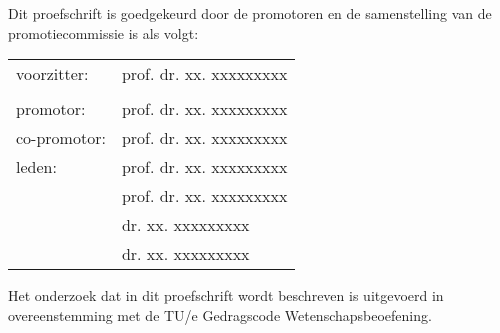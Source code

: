 \newpage
\thispagestyle{empty}

\noindent
Dit proefschrift is goedgekeurd door de promotoren en de samenstelling van de promotiecommissie is als volgt:\\[7mm]

\noindent
\begin{tabular}{@{}l p{9.8cm}}
voorzitter:                 &   prof. dr. xx. xxxxxxxxx \\                \\
promotor:                   &   prof. dr. xx. xxxxxxxxx \\
co-promotor:                &   prof. dr. xx. xxxxxxxxx \\
leden:                      &   prof. dr. xx. xxxxxxxxx \\
                            &   prof. dr. xx. xxxxxxxxx \\
                            &   dr. xx. xxxxxxxxx \\
                            &   dr. xx. xxxxxxxxx \\
\end{tabular}

\vfill
\noindent
Het onderzoek dat in dit proefschrift wordt beschreven is uitgevoerd in overeenstemming met de TU/e Gedragscode Wetenschapsbeoefening.
